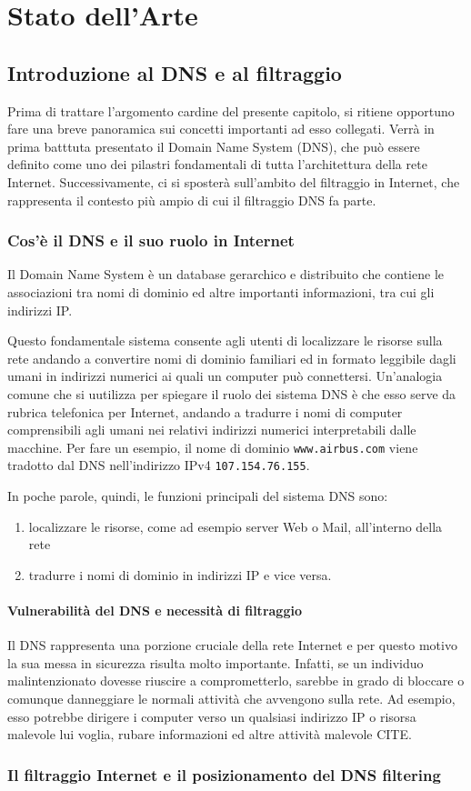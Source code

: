 \chapter{Stato dell'Arte}

\section{Introduzione al DNS e al filtraggio}
Prima di trattare l'argomento cardine del presente capitolo, si ritiene opportuno fare una breve panoramica sui concetti importanti ad esso collegati. Verrà in prima batttuta presentato il Domain Name System (DNS), che può essere definito come uno dei pilastri fondamentali di tutta l'architettura della rete Internet. Successivamente, ci si sposterà sull'ambito del filtraggio in Internet, che rappresenta il contesto più ampio di cui il filtraggio DNS fa parte.

\subsection{Cos'è il DNS e il suo ruolo in Internet}
Il Domain Name System è un database gerarchico e distribuito che contiene le associazioni tra nomi di dominio ed altre importanti informazioni, tra cui gli indirizzi IP.

Questo fondamentale sistema consente agli utenti di localizzare le risorse sulla rete andando a convertire nomi di dominio familiari ed in formato leggibile dagli umani in indirizzi numerici ai quali un computer può connettersi. Un'analogia comune che si uutilizza per spiegare il ruolo dei sistema DNS è che esso serve da rubrica telefonica per Internet, andando a tradurre i nomi di computer comprensibili agli umani nei relativi indirizzi numerici interpretabili dalle macchine. Per fare un esempio, il nome di dominio \texttt{www.airbus.com} viene tradotto dal DNS nell'indirizzo IPv4 \texttt{107.154.76.155}.

In poche parole, quindi, le funzioni principali del sistema DNS sono:
\begin{enumerate}
  \item localizzare le risorse, come ad esempio server Web o Mail, all'interno della rete
  \item tradurre i nomi di dominio in indirizzi IP e vice versa.
\end{enumerate}

\subsubsection{Vulnerabilità del DNS e necessità di filtraggio}
Il DNS rappresenta una porzione cruciale della rete Internet e per questo motivo la sua messa in sicurezza risulta molto importante. Infatti, se un individuo malintenzionato dovesse riuscire a comprometterlo, sarebbe in grado di bloccare o comunque danneggiare le normali attività che avvengono sulla rete. Ad esempio, esso potrebbe dirigere i computer verso un qualsiasi indirizzo IP o risorsa malevole lui voglia, rubare informazioni ed altre attività malevole CITE.

\subsection{Il filtraggio Internet e il posizionamento del DNS filtering}
